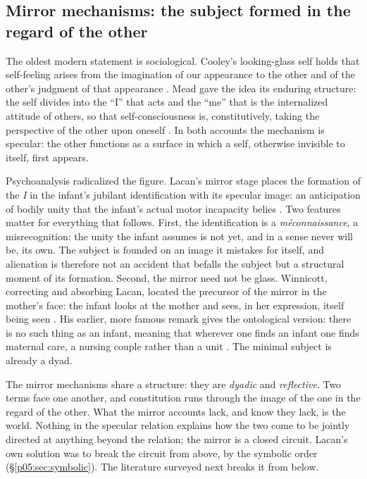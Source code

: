 \documentclass[11pt,a4paper]{article}
\theoremstyle{seriesthm}
\begin{document}
\subsection{Mirror mechanisms: the subject formed in the regard of the other}
\label{p05:sec:mirror}

The oldest modern statement is sociological. Cooley's looking-glass self holds that self-feeling arises from the imagination of our appearance to the other and of the other's judgment of that appearance \parencite{cooley1902}. Mead gave the idea its enduring structure: the self divides into the ``I'' that acts and the ``me'' that is the internalized attitude of others, so that self-consciousness is, constitutively, taking the perspective of the other upon oneself \parencite{mead1934}. In both accounts the mechanism is specular: the other functions as a surface in which a self, otherwise invisible to itself, first appears.

Psychoanalysis radicalized the figure. Lacan's mirror stage places the formation of the \emph{I} in the infant's jubilant identification with its specular image: an anticipation of bodily unity that the infant's actual motor incapacity belies \parencite{lacan2006}. Two features matter for everything that follows. First, the identification is a \emph{m\'econnaissance}, a misrecognition: the unity the infant assumes is not yet, and in a sense never will be, its own. The subject is founded on an image it mistakes for itself, and alienation is therefore not an accident that befalls the subject but a structural moment of its formation. Second, the mirror need not be glass. Winnicott, correcting and absorbing Lacan, located the precursor of the mirror in the mother's face: the infant looks at the mother and sees, in her expression, itself being seen \parencite{winnicott1971}. His earlier, more famous remark gives the ontological version: there is no such thing as an infant, meaning that wherever one finds an infant one finds maternal care, a nursing couple rather than a unit \parencite{winnicott1960}. The minimal subject is already a dyad.

The mirror mechanisms share a structure: they are \emph{dyadic} and \emph{reflective}. Two terms face one another, and constitution runs through the image of the one in the regard of the other. What the mirror accounts lack, and know they lack, is the world. Nothing in the specular relation explains how the two come to be jointly directed at anything beyond the relation; the mirror is a closed circuit. Lacan's own solution was to break the circuit from above, by the symbolic order (§\ref{p05:sec:symbolic}). The literature surveyed next breaks it from below.
\end{document}
